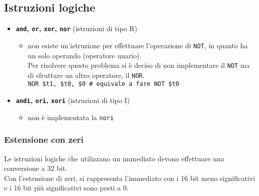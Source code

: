 \documentclass[../main.tex]{subfiles}
\begin{document}
\subsection{Istruzioni logiche}
\begin{itemize}
    \item \textbf{\texttt{and}, \texttt{or}, \texttt{xor}, \texttt{nor}} (istruzioni di tipo R)
    \begin{itemize}
        \item non esiste un'istruzione per effettuare l'operazione di
        \texttt{NOT}, in quanto ha un solo operando (operatore unario). \\
        Per risolvere questo problema si è deciso di non implementare
        il \texttt{NOT} ma di sfruttare un altro operatore, il \texttt{NOR}. \\
        \hspace*{0cm} \hspace*{0cm} \hspace*{0cm} \hspace*{0cm} \texttt{NOR \$t1, \$t0, \$0 \hspace*{0cm} \# equivale a fare NOT \$t0}
    \end{itemize}
    \vspace*{1mm}
    \item \textbf{\texttt{andi}, \texttt{ori}, \texttt{xori}} (istruzioni di tipo I)
    \begin{itemize}
        \item non è implementata la \texttt{nori}
    \end{itemize}
\end{itemize}

\subsubsection*{Estensione con zeri}
Le istruzioni logiche che utilizzano un immediato devono
effettuare una conversione a 32 bit. \\
Con l'estensione di zeri, si rappresenta l'immediato con i 16 bit
meno significativi e i 16 bit più significativi sono posti a 0.
\end{document}
